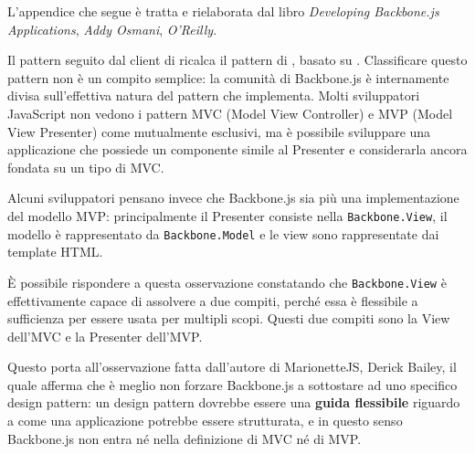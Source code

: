 


L'appendice che segue è tratta e rielaborata dal libro \emph{Developing Backbone.js Applications}, \emph{Addy Osmani}, \emph{O'Reilly}.

Il pattern seguito dal client di \proj{} ricalca il pattern di \jointjs, basato su \backbonejs. Classificare questo pattern non è un compito semplice: la comunità di Backbone.js è internamente divisa sull'effettiva natura del pattern che implementa. Molti sviluppatori JavaScript non vedono i pattern MVC (Model View Controller) e MVP (Model View Presenter) come mutualmente esclusivi, ma è possibile sviluppare una applicazione che possiede un componente simile al Presenter e considerarla ancora fondata su un tipo di MVC.

Alcuni sviluppatori pensano invece che Backbone.js sia più una implementazione del modello MVP: principalmente il Presenter consiste nella \texttt{Backbone.View}, il modello è rappresentato da \texttt{Backbone.Model} e le view sono rappresentate dai template HTML. 

È possibile rispondere a questa osservazione constatando che \texttt{Backbone.View} è effettivamente capace di assolvere a due compiti, perché essa è flessibile a sufficienza per essere usata per multipli scopi. Questi due compiti sono la View dell'MVC e la Presenter dell'MVP.

Questo porta all'osservazione fatta dall'autore di MarionetteJS, Derick Bailey, il quale afferma che è meglio non forzare Backbone.js a sottostare ad uno specifico design pattern: un design pattern dovrebbe essere una \textbf{guida flessibile} riguardo a come una applicazione potrebbe essere strutturata, e in questo senso Backbone.js non entra né nella definizione di MVC né di MVP.
